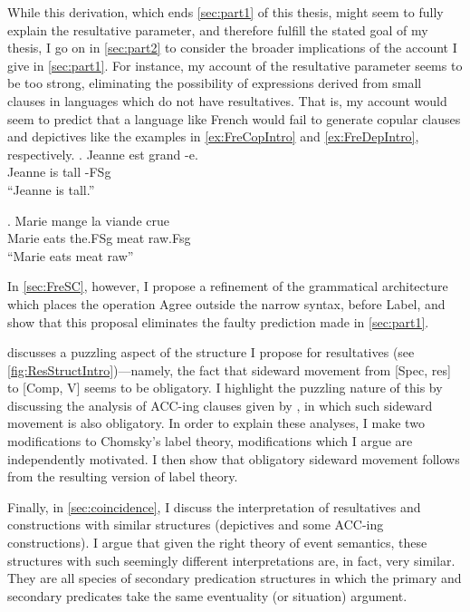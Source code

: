 \documentclass[MilwayThesis]{subfiles}
\begin{document}
While this derivation, which ends \cref{sec:part1} of this thesis, might seem to fully explain the resultative parameter, and therefore fulfill the stated goal of my thesis, I go on in \cref{sec:part2} to consider the broader implications of the account I give in \cref{sec:part1}.
For instance, my account of the resultative parameter seems to be too strong, eliminating the possibility of expressions derived from small clauses in languages which do not have resultatives.
That is, my account would seem to predict that a language like French would fail to generate copular clauses and depictives like the examples in \cref{ex:FreCopIntro} and \cref{ex:FreDepIntro}, respectively.
\exg. \label{ex:FreCopIntro}Jeanne est grand -e.\\
Jeanne is tall -FSg\\
``Jeanne is tall.''

\exg. \label{ex:FreDepIntro}Marie mange la viande crue\\
Marie eats the.FSg meat raw.Fsg\\
``Marie eats meat raw''

In \cref{sec:FreSC}, however, I propose a refinement of the grammatical architecture which places the operation Agree outside the narrow syntax, before Label, and show that this proposal eliminates the faulty prediction made in \cref{sec:part1}.

 discusses a puzzling aspect of the structure I propose for resultatives (see \cref{fig:ResStructIntro})---namely, the fact that sideward movement from [Spec, res] to [Comp, V] seems to be obligatory.
I highlight the puzzling nature of this by discussing the analysis of ACC-ing clauses given by \textcite{cinque1996pseudo}, in which such sideward movement is also obligatory.
In order to explain these analyses, I make two modifications to Chomsky's label theory, modifications which I argue are independently motivated.
I then show that obligatory sideward movement follows from the resulting version of label theory.

Finally, in \cref{sec:coincidence}, I discuss the interpretation of resultatives and constructions with similar structures (depictives and some ACC-ing constructions).
I argue that given the right theory of event semantics, these structures with such seemingly different interpretations are, in fact, very similar.
They are all species of secondary predication structures in which the primary and secondary predicates take the same eventuality (or situation) argument.
\end{document}
